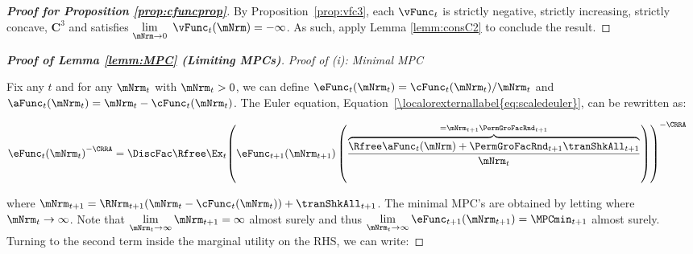 \documentclass[\econtexRoot/BufferStockTheory]{subfiles}
\begin{document}
 
\hypertarget{cFunc-is-Twice-Continuously-Differentiable}{}
\begin{proof}[\textbf{\textit{Proof for Proposition \ref{prop:cfuncprop}}}]

By Proposition~\ref{prop:vfc3}, each $\vFunc_{t}$ is strictly negative, strictly increasing, strictly concave, $\mathbf{C}^{3}$ and satisfies $\lim\limits_{\mNrm\rightarrow 0}~\vFunc_{t}(\mNrm) =-\infty $. As such, apply Lemma \ref{lemm:consC2} to conclude the result. 

\end{proof}


\begin{comment}
\textcolor{blue}{Add remaining links to proof of existence of MPCs. Check use of DMC.}
\end{comment}

\begin{proof}[\textbf{Proof of Lemma \ref{lemm:MPC} (Limiting MPCs)}]

\vspace{0.7em} %
\noindent\textit{Proof of (i): Minimal MPC}  %
\vspace{0.7em} %

Fix any $t$ and for any $\mNrm_{t}$ with  $\mNrm_{t}>0$, we can define $\eFunc_{t}(\mNrm_{t})=\cFunc_{t}(\mNrm_{t})/\mNrm_{t}$ and $\aFunc_{t}(\mNrm_{t})= \mNrm_{t} -\cFunc_{t}(\mNrm_{t})$. The Euler equation, Equation~\eqref{\localorexternallabel{eq:scaledeuler}}, can be rewritten as:


\begin{equation}\begin{gathered}\begin{aligned}\label{eq:eFuncEuler}
 \eFunc_{t}{(\mNrm_{t})}^{-\CRRA}  & = \DiscFac \Rfree \Ex_{t}{\left(\eFunc_{t+1}({\mNrm}_{t+1})\left(\frac{\overbrace{\Rfree \aFunc_{t}(\mNrm)+{\PermGroFacRnd}_{t+1}{\tranShkAll}_{t+1}}^{={\mNrm}_{t+1} \PermGroFacRnd_{t+1}}}{\mNrm_{t}}\right)\right)}^{-\CRRA }
\end{aligned}\end{gathered}\end{equation}
%
%

where ${\mNrm}_{t+1} = \RNrm_{t+1}(\mNrm_{t} -\cFunc_{t}(\mNrm_{t})) +\tranShkAll_{t+1}$. The minimal MPC's are obtained by letting where $\mNrm_{t} \rightarrow \infty$. Note that $\lim\limits_{\mNrm_{t}\rightarrow \infty} \mNrm_{t+1} = \infty$ almost surely and thus $\lim\limits_{\mNrm_{t}\rightarrow \infty}\eFunc_{t+1}({\mNrm}_{t+1}) = \MPCmin_{t+1}$ almost surely. Turning to the second term inside the marginal utility on the RHS, we can write:


\end{proof}
\end{document}
